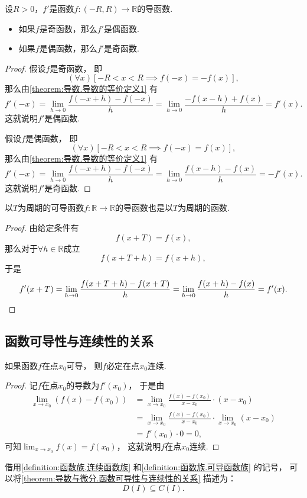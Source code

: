 \begin{proposition}\label{theorem:导数与微分.导函数的奇偶性}
设\(R>0\)，\(f'\)是函数\(f\colon(-R,R)\to\mathbb{R}\)的导函数.
\begin{itemize}
	\item 如果\(f\)是奇函数，那么\(f'\)是偶函数.
	\item 如果\(f\)是偶函数，那么\(f'\)是奇函数.
\end{itemize}
\begin{proof}
假设\(f\)是奇函数，
即\[
	(\forall x)
	[
		-R < x < R
		\implies
		f(-x) = -f(x)
	],
\]
那么由\cref{theorem:导数.导数的等价定义1} 有\[
	f'(-x)
	= \lim_{h\to0} \frac{f(-x+h)-f(-x)}{h}
	= \lim_{h\to0} \frac{-f(x-h)+f(x)}{h}
	= f'(x).
\]
这就说明\(f'\)是偶函数.

假设\(f\)是偶函数，
即\[
	(\forall x)
	[
		-R < x < R
		\implies
		f(-x) = f(x)
	],
\]
那么由\cref{theorem:导数.导数的等价定义1} 有\[
	f'(-x)
	= \lim_{h\to0} \frac{f(-x+h)-f(-x)}{h}
	= \lim_{h\to0} \frac{f(x-h)-f(x)}{h}
	= -f'(x).
\]
这就说明\(f'\)是奇函数.
\end{proof}
\end{proposition}
\begin{proposition}\label{theorem:导数与微分.导函数的周期性}%
以\(T\)为周期的可导函数\(f\colon\mathbb{R}\to\mathbb{R}\)的导函数也是以\(T\)为周期的函数.
\begin{proof}
由给定条件有\[
	f(x+T) = f(x),
\]
那么对于\(\forall h\in\mathbb{R}\)成立\[
	f(x+T+h) = f(x+h),
\]
于是\begin{equation*}
	f'(x+T)
	= \lim_{h\to0} \frac{f(x+T+h) - f(x+T)}{h}
	= \lim_{h\to0} \frac{f(x+h) - f(x)}{h}
	= f'(x).
	\qedhere
\end{equation*}
\end{proof}
\end{proposition}

\subsection{函数可导性与连续性的关系}
\begin{theorem}\label{theorem:导数与微分.函数可导性与连续性的关系}
如果函数\(f\)在点\(x_0\)可导，
则\(f\)必定在点\(x_0\)连续.
\begin{proof}
记\(f\)在点\(x_0\)的导数为\(f'(x_0)\)，
于是由\begin{align*}
	\lim_{x \to x_0} (f(x) - f(x_0))
	&= \lim_{x \to x_0} \frac{f(x) - f(x_0)}{x - x_0} \cdot (x - x_0) \\
	&= \lim_{x \to x_0} \frac{f(x) - f(x_0)}{x - x_0} \cdot \lim_{x \to x_0} (x - x_0) \\
	&= f'(x_0) \cdot 0
	= 0,
\end{align*}
可知\(\lim_{x \to x_0} f(x) = f(x_0)\)，
这就说明\(f\)在点\(x_0\)连续.
\end{proof}
\end{theorem}
借用\cref{definition:函数族.连续函数族} 和\cref{definition:函数族.可导函数族} 的记号，
可以将\cref{theorem:导数与微分.函数可导性与连续性的关系} 描述为：\[
	D(I) \subseteq C(I).
\]

